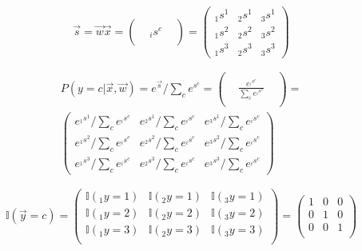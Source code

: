 \documentclass[12pt,a4paper]{article}%
\theoremstyle{definition}
\theoremstyle{plain}
\numberwithin{equation}{section}
\begin{document}
\begin{equation}
\vec{s} = \vec{w} \vec{x} = \begin{pmatrix}
  &   &  \\
  &  {}_is^{c} &  \\
 &   & 
\end{pmatrix} = \begin{pmatrix}
{}_1s^{1}  &  {}_2s^{1}    &  {}_3s^{1}  \\
{}_1s^{2}  &  {}_2s^{2}  &  {}_3s^{2} \\
{}_1s^{3} & {}_2s^{3}     & {}_3s^{3}
\end{pmatrix} 
\end{equation} 

\begin{gather}
P( y = c |  \vec{x}, \vec{w})  = e^{\vec{s}} / \sum\limits_{c} e^{s^{c}}  = \begin{pmatrix}
  &   &  \\
  &  \frac{e^{{}_is^{c}}}{\sum\limits_{c} e^{{}_is^{c}}}  &  \\
 &   &
\end{pmatrix} = \\ \begin{pmatrix}
e^{{}_1s^{1}} /\sum\limits_{c} e^{{}_is^{c}} &  e^{{}_2s^{1}}  /\sum\limits_{c} e^{{}_is^{c}}    &  e^{{}_3s^{1}}  /\sum\limits_{c} e^{{}_is^{c}} \\
e^{{}_1s^{2}} /\sum\limits_{c} e^{{}_is^{c}} & e^{{}_2s^{2}} /\sum\limits_{c} e^{{}_is^{c}}    & e^{{}_3s^{2}} /\sum\limits_{c} e^{{}_is^{c}} \\
e^{{}_1s^{3}} /\sum\limits_{c} e^{{}_is^{c}} & e^{{}_2s^{3}}   /\sum\limits_{c} e^{{}_is^{c}}   & e^{{}_3s^{3}}   /\sum\limits_{c} e^{{}_is^{c}} 
\end{pmatrix} 
\end{gather} 

\begin{equation}
\mathbb{I}(\vec{y}=c)  =  \begin{pmatrix}
\mathbb{I}({}_1y=1) & \mathbb{I}({}_2y=1)  & \mathbb{I}({}_3y=1)  \\
\mathbb{I}({}_1y=2) & \mathbb{I}({}_2y=2)  & \mathbb{I}({}_3y=2) \\
\mathbb{I}({}_1y=3) & \mathbb{I}({}_2y=3)  & \mathbb{I}({}_3y=3)\\
\end{pmatrix} =  \begin{pmatrix}
1  &  0  & 0  \\
0 &  1   & 0   \\
0 &  0  & 1    \\
\end{pmatrix} 
\end{equation} 
\end{document}
